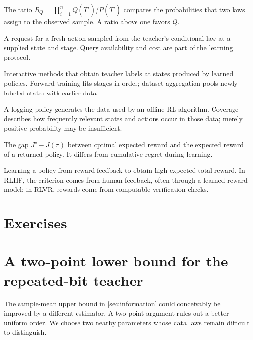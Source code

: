 \documentclass[11pt,twoside]{article}
\theoremstyle{definition}
\theoremstyle{remark}
\begin{document}
\begin{description}[style=nextline,leftmargin=1.5em,labelindent=0pt]
The ratio $R_Q=\prod_{i=1}^n Q(T^i)/P(T^i)$ compares the probabilities
that two laws assign to the observed sample. A ratio above one favors $Q$.
\item[Teacher-action query]
A request for a fresh action sampled from the teacher's conditional law
at a supplied state and stage. Query availability and cost are part of
the learning protocol.
\item[Forward training and dataset aggregation]
Interactive methods that obtain teacher labels at states produced by
learned policies. Forward training fits stages in order; dataset
aggregation pools newly labeled states with earlier data.
\item[Logging policy and coverage]
A logging policy generates the data used by an offline RL algorithm.
Coverage describes how frequently relevant states and actions occur in
those data; merely positive probability may be insufficient.
\item[Policy suboptimality]
The gap $J^\star-J(\pi)$ between optimal expected reward and the expected
reward of a returned policy. It differs from cumulative regret during learning.
\item[Reinforcement learning (RL)]
Learning a policy from reward feedback to obtain high expected total reward.
In RLHF, the criterion comes from human feedback, often through a learned
reward model; in RLVR, rewards come from computable verification checks.
\end{description}

\section{Exercises}
\label{sec:exercises}
\raggedbottom

\exerciseinstructions
\setcounter{courseexercise}{0}






\clearpage
\flushbottom
\appendix
\section{A two-point lower bound for the repeated-bit teacher}
\label{app:bernoulli}

The sample-mean upper bound in \cref{sec:information} could conceivably
be improved by a different estimator. A two-point argument rules out a
better uniform order. We choose two nearby parameters whose data laws
remain difficult to distinguish.
\end{document}
